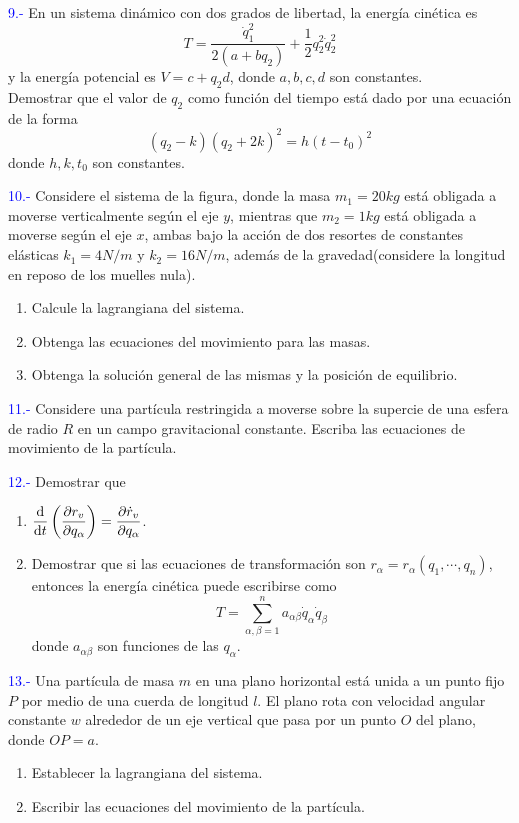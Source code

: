\documentclass[../main]{subfiles}
\begin{document}
\textcolor{blue}{9.-} En un sistema dinámico con dos grados de libertad, la energía cinética es
$$T=\dfrac{\dot{q}^2_1}{2(a+bq_2)}+\dfrac{1}{2}q^2_2\dot{q}^2_2$$
y la energía potencial es $V=c+q_2d$, donde $a, b, c, d$ son constantes.\\
Demostrar que el valor de $q_2$ como función del tiempo está dado por una ecuación de la forma 
$$(q_2-k)(q_2+2k)^2=h(t-t_0)^2$$
donde $h, k, t_0$ son constantes.

\textcolor{blue}{10.-} Considere el sistema de la figura, donde la masa $m_1=20kg$ está obligada a moverse verticalmente según el eje $y$, mientras que $m_2=1kg$ está obligada a moverse según el eje $x$, ambas bajo la acción de dos resortes de constantes elásticas $k_1=4N/m$ y $k_2=16N/m$, además de la gravedad(considere la longitud en reposo de los muelles nula).
\begin{enumerate}[label=(\alph*)]
    \item Calcule la lagrangiana del sistema.
    \item Obtenga las ecuaciones del movimiento para las masas.
    \item Obtenga la solución general de las mismas y la posición de equilibrio.
\end{enumerate} 

\textcolor{blue}{11.-} Considere una partícula restringida a moverse sobre la supercie de una esfera de radio $R$ en un campo gravitacional constante. Escriba las ecuaciones de movimiento de la partícula.

\textcolor{blue}{12.-} Demostrar que 
\begin{enumerate}[label=(\alph*)]
    \item $\displaystyle \dv{}{t}\left(\pdv{r_v}{q_{\alpha}}\right)=\pdv{\dot{r}_v}{q_{\alpha}}$.
    \item Demostrar que si las ecuaciones de transformación son $r_{\alpha}=r_{\alpha}(q_1, \cdots, q_n)$, entonces la energía cinética puede escribirse como
    $$T=\sum_{\alpha,\beta=1}^n a_{\alpha\beta}\dot{q}_{\alpha}\dot{q}_{\beta}$$
    donde $a_{\alpha\beta}$ son funciones de las $q_{\alpha}$.
\end{enumerate} 

\textcolor{blue}{13.-} Una partícula de masa $m$ en una plano horizontal está unida a un punto fijo $P$ por medio de una cuerda de longitud $l$. El plano rota con velocidad angular constante $w$ alrededor de un eje vertical que pasa por un punto $O$ del plano, donde $OP=a$.
\begin{enumerate}[label=(\alph*)]
    \item Establecer la lagrangiana del sistema.
    \item Escribir las ecuaciones del movimiento de la partícula.
\end{enumerate}
\end{document}
